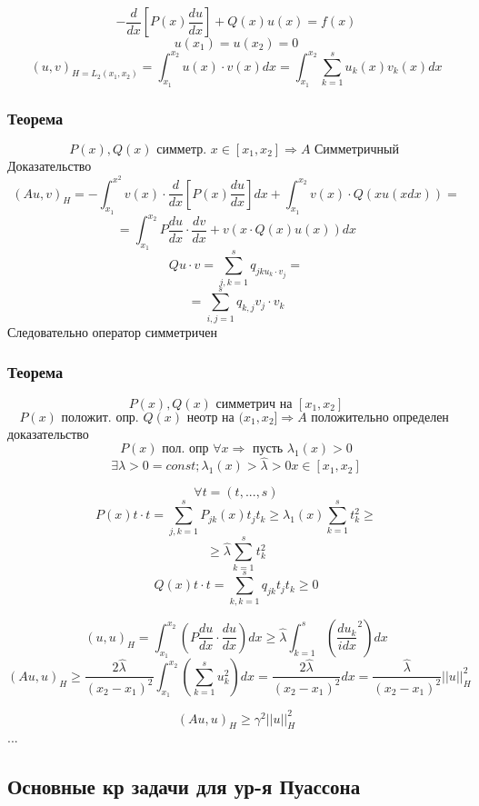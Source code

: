 \documentclass[12pt, a4paper]{article}
\begin{document}
\begin{enumerate}
	\[ - \frac{d }{dx } [P(x) \frac{du }{dx }] + Q(x) u(x) = f(x) \]
	\[ u(x_1) = u (x_2) = 0 \]
	\[ (u, v)_{H= L_2(x_1, x_2)} = \int_{x_1}^{x_2} u (x) \cdot v(x) dx = \int_{x_1}^{x_2} \sum_{k=1}^{s} u_k(x) v_k (x) dx \]

	\subsubsection{Теорема}
	\[ P(x), Q(x) \textrm{ симметр. } x \in [x_1, x_2] \Rightarrow A \textrm{ Симметричный } \]
	Доказательство
	\[ {(Au, v)}_H = - \int_{x_1}^{x^2} v(x) \cdot \frac{d}{dx} [P(x) \frac{du }{dx }] dx + \int_{x_1}^{x_2} v(x) \cdot Q(x u(x dx)) = \]
	\[ = \int_{x_1}^{x_2} P \frac{du }{dx } \cdot \frac{dv }{dx } + v(x \cdot Q(x) u(x))dx \]
	\[ Q u \cdot v = \sum_{j,k=1}^{s } q_{jk u_k \cdot v_j} =  \]
	\[ = \sum_{i,j =1}^{s} q_{k,j} v_j \cdot v_k \]
	Следовательно оператор симметричен

	\subsubsection{Теорема}
	\[ P(x), Q(x) \textrm{ симметрич на } [x_1, x_2] \]
	\[ P(x)  \textrm{ положит. опр. } Q(x)\textrm{  неотр на } (x_1, x_2] \Rightarrow A \textrm{ положительно определен } \]
	доказательство
	\[ P(x) \textrm{ пол. опр } \forall x \Rightarrow \textrm{ пусть } \lambda_1(x) >0  \]
	\[ \exists \lambda > 0 = const; \lambda_1(x) > \hat{\lambda}> 0  x \in [x_1, x_2] \]

	\[ \forall t = (t, ... , s ) \]
	\[ P(x) t \cdot t = \sum_{j, k=1}^{s } P_{jk}(x)t_j t_k \geq  \lambda_1(x) \sum_{k=1}^{s } t_k^2 \geq \]
	\[ \geq \hat{\lambda } \sum_{k=1}^{s } t^2_k \]
	\[ Q(x) t\cdot t = \sum_{k, k=1}^{s }q_{jk} t_j t_k \geq 0 \]

	\[ (u, u)_H = \int_{x_1}^{x_2} (P \frac{du }{dx } \cdot \frac{du }{dx}) dx \geq \hat{\lambda } \int_{k=1}^{s} (\frac{du_k}{idx}^2) dx \]
	\[ (Au, u)_H \geq \frac{2 \hat{\lambda}}{{(x_2 - x_1)}^2} \int_{x_1}^{x_2} (\sum_{k=1}^{s } u_k^2) dx = \frac{2 \hat{\lambda}}{{(x_2 - x_1)}^2} dx = \frac{\hat{\lambda}}{{(x_2-x_1)}^2} {||u||}^2_H \]

	\[ {(Au, u)}_H \geq \gamma^2 {||u||}^2_H \]
	...


\end{enumerate}

\subsection{Основные кр задачи для ур-я Пуассона}
\end{document}
